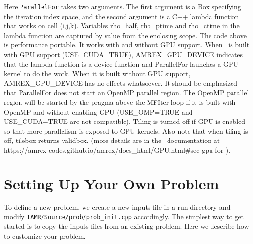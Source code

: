 Here {\tt ParallelFor} takes two arguments. The first argument is a Box specifying the iteration index space, and the second argument is a C++ lambda function that works on cell (i,j,k). Variables rho\_half, rho\_ptime and rho\_ctime in the lambda function are captured by value from the enclosing scope. The code above is performance portable. It works with and without GPU support. When \iamr\ is built with GPU support (USE\_CUDA=TRUE), AMREX\_GPU\_DEVICE indicates that the lambda function is a device function and ParallelFor launches a GPU kernel to do the work. When it is built without GPU support, AMREX\_GPU\_DEVICE has no effects whatsoever. It should be emphasized that ParallelFor does not start an OpenMP parallel region. The OpenMP parallel region will be started by the pragma above the MFIter loop if it is built with OpenMP and without enabling GPU (USE\_OMP=TRUE and USE\_CUDA=TRUE are not compatible). Tiling is turned off if GPU is enabled so that more parallelism is exposed to GPU kernels. Also note that when tiling is off, tilebox returns validbox.
(more details are in the \amrex\ documentation at
https://amrex-codes.github.io/amrex/docs\_html/GPU.html\#sec-gpu-for ).


\section{Setting Up Your Own Problem}

To define a new problem, we create a new inputs file in 
a run directory and modify
{\tt IAMR/Source/prob/prob\_init.cpp} accordingly.
The simplest way to get started is to copy the inputs files from an existing
problem.  Here we describe how to customize your problem.

